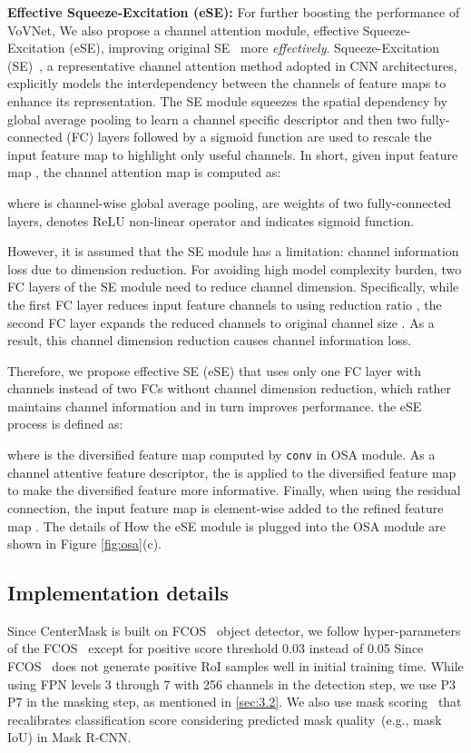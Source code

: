 \documentclass[10pt,twocolumn,letterpaper]{article}
\begin{document}
\noindent
\textbf{Effective Squeeze-Excitation (eSE):}
For further boosting the performance of VoVNet, We also propose a channel attention module, effective Squeeze-Excitation (eSE), improving original SE~\cite{hu2018squeeze} more \textit{effectively}.
Squeeze-Excitation (SE)~\cite{hu2018squeeze}, a representative channel attention method adopted in CNN architectures, explicitly models the interdependency between the channels of feature maps to enhance its representation.
The SE module squeezes the spatial dependency by global average pooling to learn a channel specific descriptor and then two fully-connected (FC) layers followed by a sigmoid function are used to rescale the input feature map to highlight only useful channels. In short, given input feature map , the channel attention map  is computed as:



\noindent
where  is channel-wise global average pooling,  are weights of two fully-connected layers,  denotes ReLU non-linear operator and  indicates sigmoid function.


However, it is assumed that the SE module has a limitation: channel information loss due to dimension reduction. 
For avoiding high model complexity burden, two FC layers of the SE module need to reduce channel dimension.
Specifically, while the first FC layer reduces input feature channels  to  using reduction ratio , the second FC layer expands the reduced channels to original channel size .
As a result, this channel dimension reduction causes channel information loss.

Therefore, we propose effective SE (eSE) that uses only one FC layer with  channels instead of two FCs without channel dimension reduction, which rather maintains channel information and in turn improves performance. the eSE process is defined as:





\noindent
where  is the diversified feature map computed by  \texttt{conv} in OSA module.
As a channel attentive feature descriptor, the  is applied to the diversified feature map  to make the diversified feature more informative. Finally, when using the residual connection, the input feature map is element-wise added to the refined feature map .
The details of How the eSE module is plugged into the OSA module are shown in Figure \ref{fig:osa}(c).




\subsection{Implementation details}
Since CenterMask is built on FCOS~\cite{Tian_2019_ICCV} object detector, we follow hyper-parameters of the FCOS~\cite{Tian_2019_ICCV} except for positive score threshold 0.03 instead of 0.05 Since FCOS~\cite{Tian_2019_ICCV} does not generate positive RoI samples well in initial training time.
While using FPN levels 3 through 7 with 256 channels in the detection step, we use P3  P7 in the masking step, as mentioned in \ref{sec:3.2}.
We also use mask scoring~\cite{huang2019mask} that recalibrates classification score considering predicted mask quality~(e.g., mask IoU) in Mask R-CNN.
\end{document}
